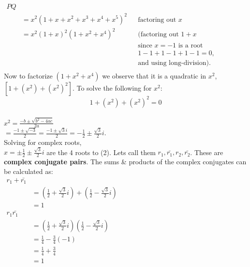 \documentclass{article}
\begin{document}
$
\begin{aligned}
    PQ\\
    & = x^2(1+x+x^2+x^3+x^4+x^5)^2
        && \text{factoring out $x$}\\
    & = x^2(1+x)^2(1+x^2+x^4)^2
        && \text{(factoring out $1+x$}\\
    &   && \text{since $x=-1$ is a root}\\
    &   && \text{$1 - 1 + 1 -1 + 1 - 1 = 0$,}\\
    &   && \text{and using long-division).}\\
\end{aligned}
$\\

Now to factorize $(1+x^2+x^4)$ we observe that
it is a quadratic in $x^2$, $[1+(x^2) + (x^2)^2]$.
To solve the following for $x^2$:\\

\begin{equation}
    1 + (x^2) + (x^2)^2 = 0
\end{equation}\\

$
x^2 = \frac{-b \pm \sqrt{b^2-4ac}}{2a}$\\

$
= \frac{-1 \pm \sqrt{-3}}{2}
= \frac{-1 \pm \sqrt{3}i}{2}
= -\frac{1}{2} \pm \frac{\sqrt{3}}{2} i$.\\

Solving for complex roots,\\

$
x = \pm \frac{1}{2} \pm \frac{\sqrt{3}}{2} i
$ are the 4 roots to (2). Lets call them
$r_1, \bar{r_1}, r_2, \bar{r_2}$.
These are \textbf{complex conjugate pairs}.
The sums \& products of the complex conjugates 
can be calculated as:\\

$
\boxed{
    \begin{aligned}
        r_1+\bar{r_1}\\
        & = (\frac{1}{2} + \frac{\sqrt{3}}{2} i)
        + (\frac{1}{2} - \frac{\sqrt{3}}{2} i)\\
        & = 1\\
        r_1\bar{r_1}\\
        & = (\frac{1}{2} + \frac{\sqrt{3}}{2} i)
        (\frac{1}{2} - \frac{\sqrt{3}}{2} i)\\
        & = \frac{1}{4}-\frac{3}{4}(-1)\\
        & = \frac{1}{4}+\frac{3}{4}\\
        & = 1
    \end{aligned}
    }
$\\
\end{document}
